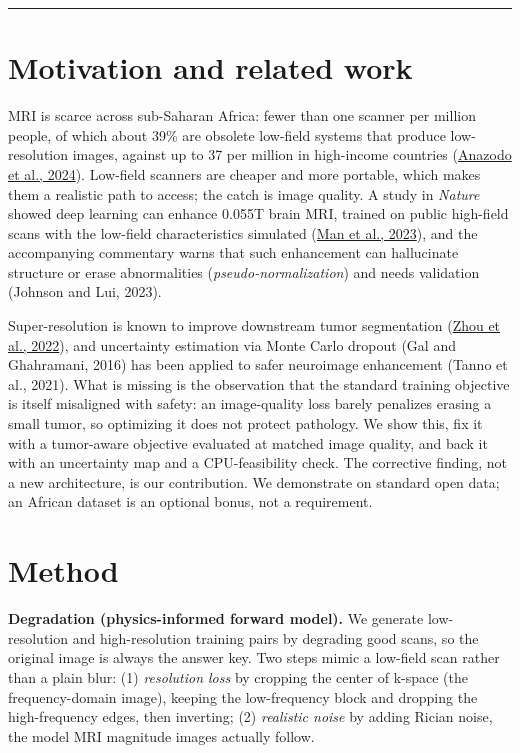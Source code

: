 \documentclass[11pt,a4paper]{article}
\newcommand{\thinrule}{\noindent\textcolor{rule}{\rule{\linewidth}{0.6pt}}}
\begin{document}
\thinrule

\section*{Motivation and related work}

MRI is scarce across sub-Saharan Africa: fewer than one scanner per million people, of which about 39\% are obsolete low-field systems that produce low-resolution images, against up to 37 per million in high-income countries (\href{https://www.nature.com/articles/s41467-024-46567-3}{Anazodo et al., 2024}). Low-field scanners are cheaper and more portable, which makes them a realistic path to access; the catch is image quality. A study in \textit{Nature} showed deep learning can enhance 0.055T brain MRI, trained on public high-field scans with the low-field characteristics simulated (\href{https://doi.org/10.1126/sciadv.adi9327}{Man et al., 2023}), and the accompanying commentary warns that such enhancement can hallucinate structure or erase abnormalities (\textit{pseudo-normalization}) and needs validation (Johnson and Lui, 2023).

Super-resolution is known to improve downstream tumor segmentation (\href{https://aapm.onlinelibrary.wiley.com/doi/full/10.1002/acm2.13758}{Zhou et al., 2022}), and uncertainty estimation via Monte Carlo dropout (Gal and Ghahramani, 2016) has been applied to safer neuroimage enhancement (Tanno et al., 2021). What is missing is the observation that the standard training objective is itself misaligned with safety: an image-quality loss barely penalizes erasing a small tumor, so optimizing it does not protect pathology. We show this, fix it with a tumor-aware objective evaluated at matched image quality, and back it with an uncertainty map and a CPU-feasibility check. The corrective finding, not a new architecture, is our contribution. We demonstrate on standard open data; an African dataset is an optional bonus, not a requirement.

\section*{Method}

\textbf{Degradation (physics-informed forward model).} We generate low-resolution and high-resolution training pairs by degrading good scans, so the original image is always the answer key. Two steps mimic a low-field scan rather than a plain blur: (1) \textit{resolution loss} by cropping the center of k-space (the frequency-domain image), keeping the low-frequency block and dropping the high-frequency edges, then inverting; (2) \textit{realistic noise} by adding Rician noise, the model MRI magnitude images actually follow.
\end{document}

